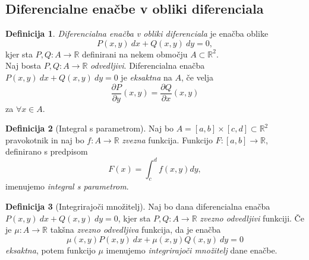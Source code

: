 \documentclass[11pt]{article}
\theoremstyle{definition}
\newtheorem{definicija}{Definicija}[section]
\theoremstyle{definition}
\theoremstyle{definition}
\theoremstyle{theorem}
\begin{document}

\subsection{Diferencialne enačbe v obliki diferenciala}
\vspace{0.5cm}

\begin{definicija}

\textit{Diferencialna enačba v obliki diferenciala} je enačba oblike 
$$P(x, y)~dx + Q(x, y)~dy = 0,$$
kjer sta $P, Q: A \rightarrow \mathbb{R}$ definirani na nekem območju $A \subset \mathbb{R}^2$. \\

Naj bosta $P, Q: A \rightarrow \mathbb{R}$ \textit{odvedljivi}. Diferencialna enačba $P(x, y)~dx + Q(x, y)~dy = 0$ je \textit{eksaktna} na $A$, če velja 
$$\frac{\partial P}{\partial y}(x, y) = \frac{\partial Q}{\partial x}(x, y)$$
za $\forall x \in A$.

\end{definicija}
\vspace{0.5cm}

\begin{definicija}[Integral s parametrom]

Naj bo $A = [a, b] \times [c, d] \subset \mathbb{R}^2$ pravokotnik in naj bo $f: A \rightarrow \mathbb{R}$ \textit{zvezna} funkcija. Funkcijo $F:[a, b] \rightarrow \mathbb{R}$, definirano s predpisom 
$$F(x) = \int_{c}^{d} f(x, y) dy,$$
imenujemo \textit{integral s parametrom}.

\end{definicija}
\vspace{0.5cm}

\begin{definicija}[Integrirajoči množitelj]

Naj bo dana diferencialna enačba $P(x, y)~dx + Q(x, y)~dy = 0$, kjer sta $P, Q: A \rightarrow \mathbb{R}$ \textit{zvezno odvedljivi} funkciji. Če je $\mu: A \rightarrow \mathbb{R}$ takšna \textit{zvezno odvedljiva} funkcija, da je enačba
$$\mu(x, y) P(x, y)~dx + \mu(x, y) Q(x, y)~dy = 0$$
\textit{eksaktna}, potem funkcijo $\mu$ imenujemo \textit{integrirajoči množitelj} dane enačbe.

\end{definicija}
\vspace{0.5cm}

\end{document}
